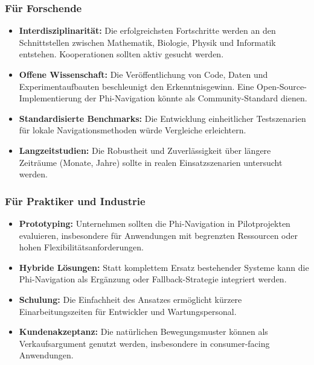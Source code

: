 ﻿\documentclass[a4paper,12pt]{article}
\theoremstyle{definition}
\begin{document}
\subsubsection{Für Forschende}

\begin{itemize}
	\item \textbf{Interdisziplinarität:} Die erfolgreichsten Fortschritte werden an den Schnittstellen zwischen Mathematik, Biologie, Physik und Informatik entstehen. Kooperationen sollten aktiv gesucht werden.
	
	\item \textbf{Offene Wissenschaft:} Die Veröffentlichung von Code, Daten und Experimentaufbauten beschleunigt den Erkenntnisgewinn. Eine Open-Source-Implementierung der Phi-Navigation könnte als Community-Standard dienen.
	
	\item \textbf{Standardisierte Benchmarks:} Die Entwicklung einheitlicher Testszenarien für lokale Navigationsmethoden würde Vergleiche erleichtern.
	
	\item \textbf{Langzeitstudien:} Die Robustheit und Zuverlässigkeit über längere Zeiträume (Monate, Jahre) sollte in realen Einsatzszenarien untersucht werden.
\end{itemize}

\subsubsection{Für Praktiker und Industrie}

\begin{itemize}
	\item \textbf{Prototyping:} Unternehmen sollten die Phi-Navigation in Pilotprojekten evaluieren, insbesondere für Anwendungen mit begrenzten Ressourcen oder hohen Flexibilitätsanforderungen.
	
	\item \textbf{Hybride Lösungen:} Statt komplettem Ersatz bestehender Systeme kann die Phi-Navigation als Ergänzung oder Fallback-Strategie integriert werden.
	
	\item \textbf{Schulung:} Die Einfachheit des Ansatzes ermöglicht kürzere Einarbeitungszeiten für Entwickler und Wartungspersonal.
	
	\item \textbf{Kundenakzeptanz:} Die natürlichen Bewegungsmuster können als Verkaufsargument genutzt werden, insbesondere in consumer-facing Anwendungen.
\end{itemize}
\end{document}
